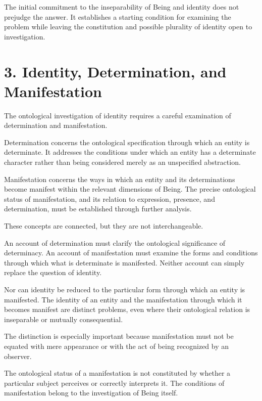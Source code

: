 The initial commitment to the inseparability of
Being and identity does not prejudge the answer.
It establishes a starting condition for examining
the problem while leaving the constitution and
possible plurality of identity open to investigation.


\section*{3. Identity, Determination, and Manifestation}

The ontological investigation of identity requires
a careful examination of determination and
manifestation.

Determination concerns the ontological specification
through which an entity is determinate. It addresses
the conditions under which an entity has a determinate
character rather than being considered merely as
an unspecified abstraction.

Manifestation concerns the ways in which an entity
and its determinations become manifest within
the relevant dimensions of Being. The precise
ontological status of manifestation, and its relation
to expression, presence, and determination, must
be established through further analysis.

These concepts are connected, but they are not
interchangeable.

An account of determination must clarify the
ontological significance of determinacy. An
account of manifestation must examine the forms
and conditions through which what is determinate
is manifested. Neither account can simply replace
the question of identity.

Nor can identity be reduced to the particular
form through which an entity is manifested.
The identity of an entity and the manifestation
through which it becomes manifest are distinct
problems, even where their ontological relation
is inseparable or mutually consequential.

The distinction is especially important because
manifestation must not be equated with mere
appearance or with the act of being recognized
by an observer.

The ontological status of a manifestation is not
constituted by whether a particular subject perceives
or correctly interprets it. The conditions of
manifestation belong to the investigation of Being
itself.

